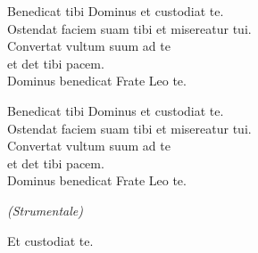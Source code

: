 
Benedicat tibi Dominus et custodiat te.\\
Ostendat faciem suam tibi et misereatur tui.\\
Convertat vultum suum ad te\\
et det tibi pacem.\\
Dominus benedicat Frate Leo te.

\spazio

 

\spazio


\spazio

Benedicat tibi Dominus et custodiat te.\\
Ostendat faciem suam tibi et misereatur tui.\\
Convertat vultum suum ad te\\
et det tibi pacem.\\
Dominus benedicat Frate Leo te.

\spazio

 

\spazio

\emph{(Strumentale)}

\spazio

Et custodiat te.